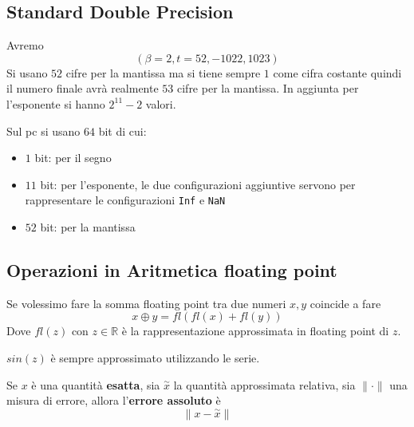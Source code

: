 \subsection{Standard Double Precision}
Avremo 
\begin{equation}
    \left(\beta = 2, t= 52, -1022, 1023\right)
\end{equation}
Si usano $52$ cifre per la mantissa ma si tiene sempre $1$ come cifra costante quindi
il numero finale avrà realmente $53$ cifre per la mantissa. In aggiunta per l'esponente si hanno 
$2^{11}-2$ valori.

Sul pc si usano $64$ bit di cui:
\begin{itemize}
    \item $1$ bit: per il segno
    \item $11$ bit: per l'esponente, le due configurazioni aggiuntive servono per 
    rappresentare le configurazioni \texttt{Inf} e \texttt{NaN}
    \item $52$ bit: per la mantissa
\end{itemize}

\subsection{Operazioni in Aritmetica floating point}
Se volessimo fare la somma floating point tra due numeri $x,y$ coincide a fare
\begin{equation}
    x \oplus y = fl(fl(x) + fl(y))
\end{equation}
Dove $fl(z)$ con $z\in \mathbb{R}$ è la rappresentazione approssimata in floating point di $z$.
\begin{nota}
    $sin(z)$ è sempre approssimato utilizzando le serie.
\end{nota}

\begin{definizione} 
    Se $x$ è una quantità \textbf{esatta}, sia $\stackrel{\sim}{x}$ la quantità approssimata
    relativa, sia $\|\cdot\|$ una misura di errore, allora l'\textbf{errore assoluto} è
    \begin{equation}
        \|x-\stackrel{\sim}{x}\|
    \end{equation} 
\end{definizione}

